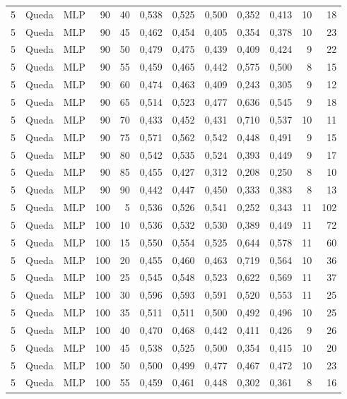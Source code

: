 \begin{longtable}{@{}rllrrrrrrrrr@{}}
5 & Queda & MLP & 90 & 40 & 0,538 & 0,525 & 0,500 & 0,352 & 0,413 & 10 & 18 \\
5 & Queda & MLP & 90 & 45 & 0,462 & 0,454 & 0,405 & 0,354 & 0,378 & 10 & 23 \\
5 & Queda & MLP & 90 & 50 & 0,479 & 0,475 & 0,439 & 0,409 & 0,424 & 9 & 22 \\
5 & Queda & MLP & 90 & 55 & 0,459 & 0,465 & 0,442 & 0,575 & 0,500 & 8 & 15 \\
5 & Queda & MLP & 90 & 60 & 0,474 & 0,463 & 0,409 & 0,243 & 0,305 & 9 & 12 \\
5 & Queda & MLP & 90 & 65 & 0,514 & 0,523 & 0,477 & 0,636 & 0,545 & 9 & 18 \\
5 & Queda & MLP & 90 & 70 & 0,433 & 0,452 & 0,431 & 0,710 & 0,537 & 10 & 11 \\
5 & Queda & MLP & 90 & 75 & 0,571 & 0,562 & 0,542 & 0,448 & 0,491 & 9 & 15 \\
5 & Queda & MLP & 90 & 80 & 0,542 & 0,535 & 0,524 & 0,393 & 0,449 & 9 & 17 \\
5 & Queda & MLP & 90 & 85 & 0,455 & 0,427 & 0,312 & 0,208 & 0,250 & 8 & 10 \\
5 & Queda & MLP & 90 & 90 & 0,442 & 0,447 & 0,450 & 0,333 & 0,383 & 8 & 13 \\
5 & Queda & MLP & 100 & 5 & 0,536 & 0,526 & 0,541 & 0,252 & 0,343 & 11 & 102 \\
5 & Queda & MLP & 100 & 10 & 0,536 & 0,532 & 0,530 & 0,389 & 0,449 & 11 & 72 \\
5 & Queda & MLP & 100 & 15 & 0,550 & 0,554 & 0,525 & 0,644 & 0,578 & 11 & 60 \\
5 & Queda & MLP & 100 & 20 & 0,455 & 0,460 & 0,463 & 0,719 & 0,564 & 10 & 36 \\
5 & Queda & MLP & 100 & 25 & 0,545 & 0,548 & 0,523 & 0,622 & 0,569 & 11 & 37 \\
5 & Queda & MLP & 100 & 30 & 0,596 & 0,593 & 0,591 & 0,520 & 0,553 & 11 & 25 \\
5 & Queda & MLP & 100 & 35 & 0,511 & 0,511 & 0,500 & 0,492 & 0,496 & 10 & 25 \\
5 & Queda & MLP & 100 & 40 & 0,470 & 0,468 & 0,442 & 0,411 & 0,426 & 9 & 26 \\
5 & Queda & MLP & 100 & 45 & 0,538 & 0,525 & 0,500 & 0,354 & 0,415 & 10 & 20 \\
5 & Queda & MLP & 100 & 50 & 0,500 & 0,499 & 0,477 & 0,467 & 0,472 & 10 & 23 \\
5 & Queda & MLP & 100 & 55 & 0,459 & 0,461 & 0,448 & 0,302 & 0,361 & 8 & 16 \\

\end{longtable}
